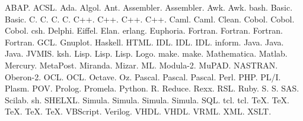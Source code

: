 \lsttestlang ABAP.
\lsttestlang ACSL.
\lsttestlang Ada.
\lsttestlang Algol.
\lsttestlang Ant.
\lsttestlang Assembler.
\lsttestlang [x86masm]Assembler.
\lsttestlang [gnu]Awk.
\lsttestlang [POSIX]Awk.
\lsttestlang bash.
\lsttestlang Basic.
\lsttestlang [Visual]Basic.
\lsttestlang [ANSI]C.
\lsttestlang [Handel]C.
\lsttestlang [Objective]C.
\lsttestlang [Sharp]C.
\lsttestlang [ISO]C++.
\lsttestlang [ANSI]C++.
\lsttestlang [GNU]C++.
\lsttestlang [Visual]C++.
\lsttestlang [light]Caml.
\lsttestlang [Objective]Caml.
\lsttestlang Clean.
\lsttestlang [ibm]Cobol.
\lsttestlang [1974]Cobol.
\lsttestlang [1985]Cobol.
\lsttestlang csh.
\lsttestlang Delphi.
\lsttestlang Eiffel.
\lsttestlang Elan.
\lsttestlang erlang.
\lsttestlang Euphoria.
\lsttestlang Fortran.
\lsttestlang [77]Fortran.
\lsttestlang [90]Fortran.
\lsttestlang [95]Fortran.
\lsttestlang GCL.
\lsttestlang Gnuplot.
\lsttestlang Haskell.
\lsttestlang HTML.
\lsttestlang IDL.
\lsttestlang [empty]IDL.
\lsttestlang [CORBA]IDL.
\lsttestlang inform.
\lsttestlang Java.
\lsttestlang [empty]Java.
\lsttestlang [AspectJ]Java.
\lsttestlang JVMIS.
\lsttestlang ksh.
\lsttestlang Lisp.
\lsttestlang [empty]Lisp.
\lsttestlang [Auto]Lisp.
\lsttestlang Logo.
\lsttestlang [empty]make.
\lsttestlang [gnu]make.
\lsttestlang Mathematica.
\lsttestlang Matlab.
\lsttestlang Mercury.
\lsttestlang MetaPost.
\lsttestlang Miranda.
\lsttestlang Mizar.
\lsttestlang ML.
\lsttestlang Modula-2.
\lsttestlang MuPAD.
\lsttestlang NASTRAN.
\lsttestlang Oberon-2.
\lsttestlang [OMG]OCL.
\lsttestlang [decorative]OCL.
\lsttestlang Octave.
\lsttestlang Oz.
\lsttestlang [Borland6]Pascal.
\lsttestlang [Standard]Pascal.
\lsttestlang [XSC]Pascal.
\lsttestlang Perl.
\lsttestlang PHP.
\lsttestlang PL/I.
\lsttestlang Plasm.
\lsttestlang POV.
\lsttestlang Prolog.
\lsttestlang Promela.
\lsttestlang Python.
\lsttestlang R.
\lsttestlang Reduce.
\lsttestlang Rexx.
\lsttestlang RSL.
\lsttestlang Ruby.
\lsttestlang [PLUS]S.
\lsttestlang [empty]S.
\lsttestlang SAS.
\lsttestlang Scilab.
\lsttestlang sh.
\lsttestlang SHELXL.
\lsttestlang [67]Simula.
\lsttestlang [CII]Simula.
\lsttestlang [DEC]Simula.
\lsttestlang [IBM]Simula.
\lsttestlang SQL.
\lsttestlang [empty]tcl.
\lsttestlang [tk]tcl.
\lsttestlang [AlLaTeX]TeX.
\lsttestlang [common]TeX.
\lsttestlang [LaTeX]TeX.
\lsttestlang [plain]TeX.
\lsttestlang [primitive]TeX.
\lsttestlang VBScript.
\lsttestlang Verilog.
\lsttestlang [empty]VHDL.
\lsttestlang [AMS]VHDL.
\lsttestlang [97]VRML.
\lsttestlang XML.
\lsttestlang XSLT.
